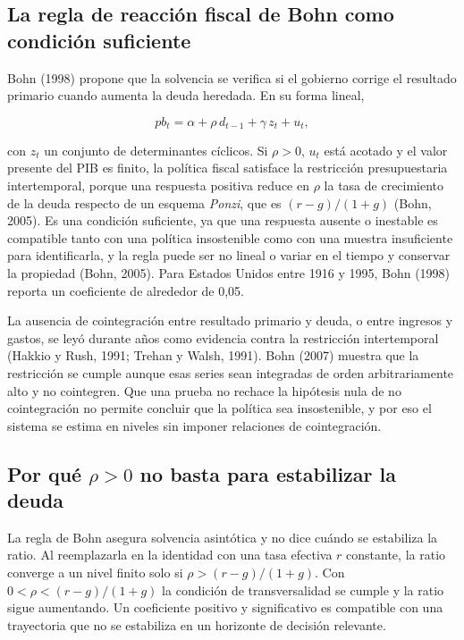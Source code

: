 \subsection{La regla de reacción fiscal de Bohn como condición
suficiente}

Bohn (1998) propone que la solvencia se verifica si el gobierno corrige
el resultado primario cuando aumenta la deuda heredada. En su forma
lineal,

\[pb_t = \alpha + \rho\, d_{t-1} + \gamma\, z_t + u_t,\]

con \(z_t\) un conjunto de determinantes cíclicos. Si \(\rho > 0\),
\(u_t\) está acotado y el valor presente del PIB es finito, la política
fiscal satisface la restricción presupuestaria intertemporal, porque una
respuesta positiva reduce en \(\rho\) la tasa de crecimiento de la deuda
respecto de un esquema \emph{Ponzi}, que es \((r-g)/(1+g)\) (Bohn,
2005). Es una condición suficiente, ya que una respuesta ausente o
inestable es compatible tanto con una política insostenible como con una
muestra insuficiente para identificarla, y la regla puede ser no lineal
o variar en el tiempo y conservar la propiedad (Bohn, 2005). Para
Estados Unidos entre 1916 y 1995, Bohn (1998) reporta un coeficiente de
alrededor de 0,05.

La ausencia de cointegración entre resultado primario y deuda, o entre
ingresos y gastos, se leyó durante años como evidencia contra la
restricción intertemporal (Hakkio y Rush, 1991; Trehan y Walsh, 1991).
Bohn (2007) muestra que la restricción se cumple aunque esas series sean
integradas de orden arbitrariamente alto y no cointegren. Que una prueba
no rechace la hipótesis nula de no cointegración no permite concluir que
la política sea insostenible, y por eso el sistema se estima en niveles
sin imponer relaciones de cointegración.

\subsection{\texorpdfstring{Por qué \(\rho > 0\) no basta para
estabilizar la
deuda}{Por qué \textbackslash rho \textgreater{} 0 no basta para estabilizar la deuda}}

La regla de Bohn asegura solvencia asintótica y no dice cuándo se
estabiliza la ratio. Al reemplazarla en la identidad con una tasa
efectiva \(r\) constante, la ratio converge a un nivel finito solo si
\(\rho > (r-g)/(1+g)\). Con \(0 < \rho < (r-g)/(1+g)\) la condición de
transversalidad se cumple y la ratio sigue aumentando. Un coeficiente
positivo y significativo es compatible con una trayectoria que no se
estabiliza en un horizonte de decisión relevante.


